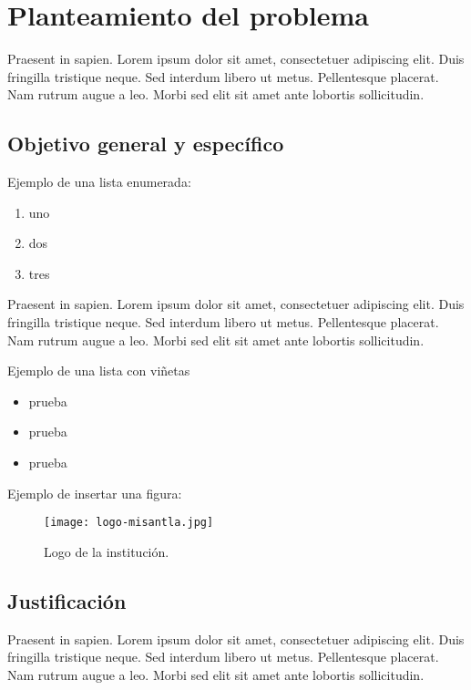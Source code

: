 \chapter{Planteamiento del problema}

Praesent in sapien. Lorem ipsum dolor sit amet, consectetuer adipiscing 
elit. Duis fringilla tristique neque. Sed interdum libero ut metus. 
Pellentesque placerat. Nam rutrum augue a leo. Morbi sed elit sit amet 
ante lobortis sollicitudin.

\section{Objetivo general y específico}

Ejemplo de una lista enumerada:

\begin{enumerate}
	\item uno
	\item dos
	\item tres
\end{enumerate}

Praesent in sapien. Lorem ipsum dolor sit amet, consectetuer adipiscing 
elit. Duis fringilla tristique neque. Sed interdum libero ut metus. 
Pellentesque placerat. Nam rutrum augue a leo. Morbi sed elit sit amet 
ante lobortis sollicitudin.

Ejemplo de una lista con viñetas

\begin{itemize}
	\item prueba 
	\item prueba 
	\item prueba
\end{itemize}

Ejemplo de insertar una figura:
\begin{figure}[H]
	\caption{Logo de la institución.}
	\centering
	\texttt{[image: logo-misantla.jpg]}
\end{figure}

\section{Justificación}


Praesent in sapien. Lorem ipsum dolor sit amet, consectetuer adipiscing 
elit. Duis fringilla tristique neque. Sed interdum libero ut metus. 
Pellentesque placerat. Nam rutrum augue a leo. Morbi sed elit sit amet 
ante lobortis sollicitudin.



